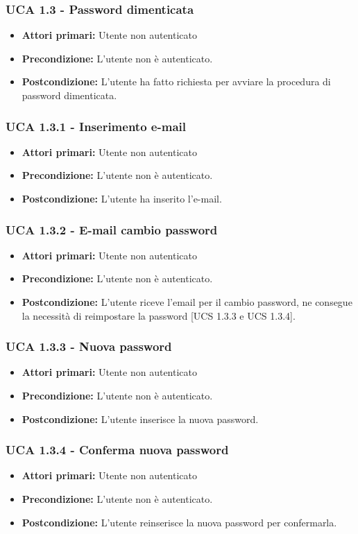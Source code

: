 \subsubsection{UCA 1.3 - Password dimenticata}%
\begin{itemize}
\item \textbf{Attori primari:} Utente non autenticato
\item \textbf{Precondizione:}  L'utente non è autenticato.
\item \textbf{Postcondizione:} L'utente ha fatto richiesta per avviare la procedura di password dimenticata.
\end{itemize}

\subsubsection{UCA 1.3.1 - Inserimento e-mail}
\begin{itemize}
\item \textbf{Attori primari:} Utente non autenticato
\item \textbf{Precondizione:} L'utente non è autenticato. %
\item \textbf{Postcondizione:} L'utente ha inserito l'e-mail.
\end{itemize}

\subsubsection{UCA 1.3.2 - E-mail cambio password}
\begin{itemize}
\item \textbf{Attori primari:} Utente non autenticato
\item \textbf{Precondizione:} L'utente non è autenticato.
\item \textbf{Postcondizione:} L'utente riceve l'email per il cambio password, ne consegue la necessità di reimpostare la password [UCS 1.3.3 e UCS 1.3.4].
\end{itemize}

\subsubsection{UCA 1.3.3 - Nuova password}
\begin{itemize}
\item \textbf{Attori primari:} Utente non autenticato
\item \textbf{Precondizione:}  L'utente non è autenticato.
\item \textbf{Postcondizione:} L'utente inserisce la nuova password.
\end{itemize}

\subsubsection{UCA 1.3.4 - Conferma nuova password}
\begin{itemize}
\item \textbf{Attori primari:} Utente non autenticato
\item \textbf{Precondizione:} L'utente non è autenticato.
\item \textbf{Postcondizione:} L'utente reinserisce la nuova password per confermarla.
\end{itemize}